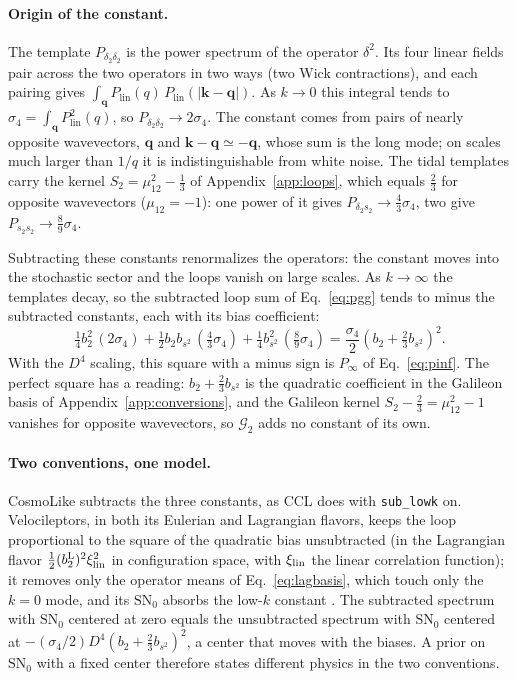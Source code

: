 \documentclass[11pt]{article}
\newcommand{\btwo}{b_2}            %
\newcommand{\bs}{b_{s^2}}          %
\newcommand{\btwoL}{b_2^{\mathrm{L}}}
\newcommand{\plin}{P_{\mathrm{lin}}}
\newcommand{\SNz}{\mathrm{SN}_0}
\begin{document}
\paragraph{Origin of the constant.}
The template $P_{\delta_2\delta_2}$ is the power spectrum of the
operator $\delta^2$.  Its four linear fields pair across the two
operators in two ways (two Wick contractions), and each pairing gives
$\int_{\mathbf{q}}\plin(q)\,\plin(|\mathbf{k}-\mathbf{q}|)$.  As
$k \to 0$ this integral tends to $\sigma_4 = \int_{\mathbf{q}}\plin^2(q)$,
so $P_{\delta_2\delta_2} \to 2\sigma_4$.  The constant comes from pairs
of nearly opposite wavevectors, $\mathbf{q}$ and
$\mathbf{k}-\mathbf{q} \simeq -\mathbf{q}$, whose sum is the long mode;
on scales much larger than $1/q$ it is indistinguishable from white
noise.  The tidal templates carry the kernel
$S_2 = \mu_{12}^2 - \tfrac{1}{3}$ of Appendix~\ref{app:loops}, which
equals $\tfrac{2}{3}$ for opposite wavevectors ($\mu_{12} = -1$): one
power of it gives $P_{\delta_2 s_2} \to \tfrac{4}{3}\sigma_4$, two give
$P_{s_2 s_2} \to \tfrac{8}{9}\sigma_4$.

Subtracting these constants renormalizes the operators: the constant
moves into the stochastic sector and the loops vanish on large scales.
As $k \to \infty$ the templates decay, so the subtracted loop sum of
Eq.~\eqref{eq:pgg} tends to minus the subtracted constants, each with
its bias coefficient:
\begin{equation}
\tfrac{1}{4}\btwo^2\,(2\sigma_4)
 + \tfrac{1}{2}\btwo\bs\,(\tfrac{4}{3}\sigma_4)
 + \tfrac{1}{4}\bs^2\,(\tfrac{8}{9}\sigma_4)
 = \frac{\sigma_4}{2}\left(\btwo + \tfrac{2}{3}\bs\right)^2 .
\label{eq:pinf-algebra}
\end{equation}
With the $D^4$ scaling, this square with a minus sign is $P_\infty$ of
Eq.~\eqref{eq:pinf}.  The perfect square has a reading:
$\btwo + \tfrac{2}{3}\bs$ is the quadratic coefficient in the Galileon
basis of Appendix~\ref{app:conversions}, and the Galileon kernel
$S_2 - \tfrac{2}{3} = \mu_{12}^2 - 1$ vanishes for opposite
wavevectors, so $\mathcal{G}_2$ adds no constant of its own.

\paragraph{Two conventions, one model.}
CosmoLike subtracts the three constants, as CCL does with
\texttt{sub\_lowk} on.  Velocileptors, in both its Eulerian and
Lagrangian flavors, keeps the loop proportional to the square of the
quadratic bias unsubtracted (in the Lagrangian flavor
$\tfrac{1}{2}(\btwoL)^2\xi_{\rm lin}^2$ in configuration space, with
$\xi_{\rm lin}$ the linear correlation function); it removes only the
operator means of Eq.~\eqref{eq:lagbasis}, which touch only the $k = 0$
mode, and its $\SNz$ absorbs the low-$k$ constant
\cite{ChenVlahWhite2020,Maus2024}.  The subtracted spectrum with $\SNz$
centered at zero equals the unsubtracted spectrum with $\SNz$ centered
at $-(\sigma_4/2)D^4(\btwo + \tfrac{2}{3}\bs)^2$, a center that moves
with the biases.  A prior on $\SNz$ with a fixed center therefore
states different physics in the two conventions.
\end{document}
